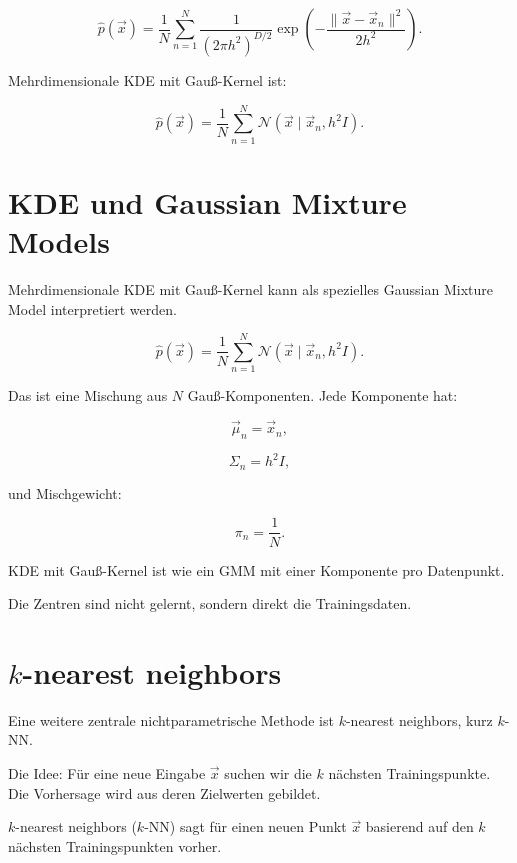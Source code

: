 \[
    \hat{p}(\vec{x})
    =
    \frac{1}{N}
    \sum_{n=1}^{N}
    \frac{1}{(2\pi h^2)^{D/2}}
    \exp
    \left(
        -\frac{\|\vec{x}-\vec{x}_n\|^2}{2h^2}
    \right).
\]

\begin{definitionbox}
Mehrdimensionale KDE mit Gauß-Kernel ist:

\[
    \hat{p}(\vec{x})
    =
    \frac{1}{N}
    \sum_{n=1}^{N}
    \mathcal{N}(\vec{x}\mid\vec{x}_n,h^2I).
\]
\end{definitionbox}

\section{KDE und Gaussian Mixture Models}

Mehrdimensionale KDE mit Gauß-Kernel kann als spezielles Gaussian Mixture Model interpretiert werden.

\[
    \hat{p}(\vec{x})
    =
    \frac{1}{N}
    \sum_{n=1}^{N}
    \mathcal{N}(\vec{x}\mid\vec{x}_n,h^2I).
\]

Das ist eine Mischung aus \(N\) Gauß-Komponenten.
Jede Komponente hat:

\[
    \vec{\mu}_n=\vec{x}_n,
\]

\[
    \Sigma_n=h^2I,
\]

und Mischgewicht:

\[
    \pi_n=\frac{1}{N}.
\]

\begin{conceptbox}
KDE mit Gauß-Kernel ist wie ein GMM mit einer Komponente pro Datenpunkt.

Die Zentren sind nicht gelernt, sondern direkt die Trainingsdaten.
\end{conceptbox}

\section{\(k\)-nearest neighbors}

Eine weitere zentrale nichtparametrische Methode ist \(k\)-nearest neighbors, kurz \(k\)-NN.

Die Idee:
Für eine neue Eingabe \(\vec{x}\) suchen wir die \(k\) nächsten Trainingspunkte.
Die Vorhersage wird aus deren Zielwerten gebildet.

\begin{definitionbox}
\(k\)-nearest neighbors (\(k\)-NN) sagt für einen neuen Punkt \(\vec{x}\) basierend auf den \(k\) nächsten Trainingspunkten vorher.
\end{definitionbox}


